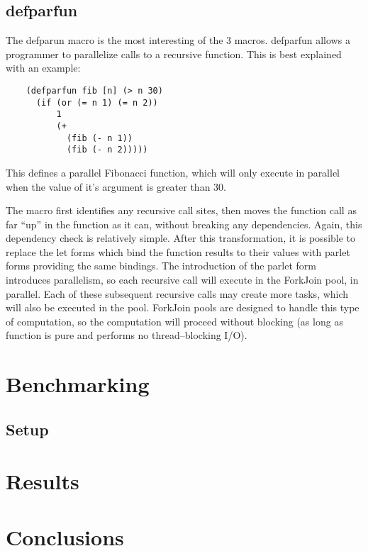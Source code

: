 \documentclass{article}
\begin{document}
\subsection{defparfun}

The defparun macro is the most interesting of the 3 macros.
defparfun allows a programmer to parallelize calls to a recursive function.
This is best explained with an example:

\begin{verbatim}
    (defparfun fib [n] (> n 30)
      (if (or (= n 1) (= n 2))
          1
          (+
            (fib (- n 1))
            (fib (- n 2)))))
\end{verbatim}

This defines a parallel Fibonacci function, which will only execute in parallel when the value of it's argument is greater than 30.

The macro first identifies any recursive call sites, then moves the function call as far ``up'' in the function as it can, without breaking any dependencies.
Again, this dependency check is relatively simple.
After this transformation, it is possible to replace the let forms which bind the function results to their values with parlet forms providing the same bindings.
The introduction of the parlet form introduces parallelism, so each recursive call will execute in the ForkJoin pool, in parallel.
Each of these subsequent recursive calls may create more tasks, which will also be executed in the pool.
ForkJoin pools are designed to handle this type of computation, so the computation will proceed without blocking (as long as function is pure and performs no thread--blocking I/O).

\section{Benchmarking}
\subsection{Setup}

\section{Results}

\section{Conclusions}
\end{document}

